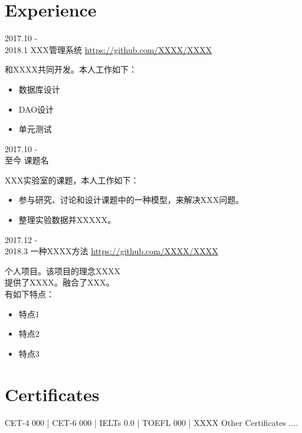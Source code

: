 \documentclass[letterpaper,UTF8]{twentysecondcv} %
\begin{document}
\section{Experience}

\begin{twenty} %
	\twentyitem
    	{2017.10 - \\2018.1}
        {XXX管理系统}
        {}
        {\href{https://github.com/XXXX/XXXX}{https://github.com/XXXX/XXXX}}
        {和XXXX共同开发。本人工作如下：
        {\begin{itemize}
        \item 数据库设计
        \item DAO设计
        \item 单元测试
        \end{itemize}}
        }
    \twentyitem
    	{2017.10 - \\ 至今}
        {课题名}
        {}
        {}
        {XXX实验室的课题，本人工作如下：{\begin{itemize}
        \item 参与研究、讨论和设计课题中的一种模型，来解决XXX问题。
        \item 整理实验数据并XXXXX。
        \end{itemize}}
        }
        
    \twentyitem
   		{2017.12 - \\ 2018.3}
        {一种XXXX方法}
        {}
        {\href{https://github.com/XXXX/XXXX}{https://github.com/XXXX/XXXX}}
        {个人项目。该项目的理念XXXX\\
        提供了XXXX。融合了XXX。\\
        有如下特点：
        {\begin{itemize}
        \item 特点1
        \item 特点2
        \item 特点3
    \end{itemize}}
        }
\end{twenty}

\section{Certificates}
\begin{twenty}
    \twentyitem
        {}
        {CET-4 000 | CET-6 000 | IELTs 0.0 | TOEFL 000 | XXXX}
        {}
        {}
        {}
    \twentyitem
        {}
        {Other Certificates ....}
        {}
        {}
        {}
\end{twenty}
\end{document}
